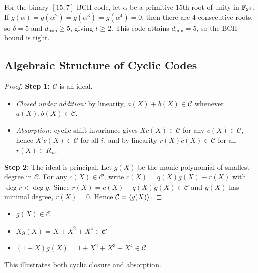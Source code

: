 \begin{example}
For the binary \([15,7]\) BCH code, let \(\alpha\) be a primitive 15th root of unity in \(\mathbb{F}_{2^4}\). If \(g(\alpha)=g(\alpha^2)=g(\alpha^3)=g(\alpha^4)=0\), then there are 4 consecutive roots, so \(\delta=5\) and \(d_{\min}\ge 5\), giving \(t\ge 2\). This code attains \(d_{\min}=5\), so the BCH bound is tight.
\end{example}

\newpage
\subsection{Algebraic Structure of Cyclic Codes}


\begin{proof}
\textbf{Step 1:} \(\mathcal{C}\) is an ideal.
\begin{itemize}
	\item \textit{Closed under addition:} by linearity, \(a(X)+b(X)\in\mathcal{C}\) whenever \(a(X),b(X)\in\mathcal{C}\).
	\item \textit{Absorption:} cyclic-shift invariance gives \(Xc(X)\in\mathcal{C}\) for any \(c(X)\in\mathcal{C}\), hence \(X^ic(X)\in\mathcal{C}\) for all \(i\), and by linearity \(r(X)c(X)\in\mathcal{C}\) for all \(r(X)\in R_n\).
\end{itemize}

\textbf{Step 2:} The ideal is principal. Let \(g(X)\) be the monic polynomial of smallest degree in \(\mathcal{C}\). For any \(c(X)\in\mathcal{C}\), write \(c(X)=q(X)g(X)+r(X)\) with \(\deg r<\deg g\). Since \(r(X)=c(X)-q(X)g(X)\in\mathcal{C}\) and \(g(X)\) has minimal degree, \(r(X)=0\). Hence \(\mathcal{C}=\langle g(X)\rangle\).
\end{proof}

\begin{example}[Checking the ideal structure for {$[7,4]_2$} with $g(X)=1+X+X^3$]
\begin{itemize}
	\item \(g(X)\in\mathcal{C}\)
	\item \(Xg(X)=X+X^2+X^4\in\mathcal{C}\)
	\item \((1+X)g(X)=1+X^2+X^3+X^4\in\mathcal{C}\)
\end{itemize}
This illustrates both cyclic closure and absorption.
\end{example}

